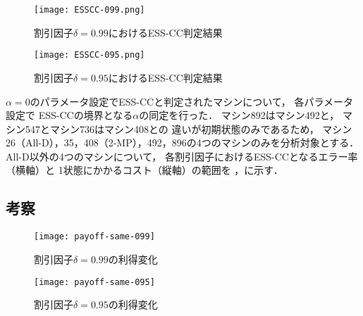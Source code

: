\documentclass[submit]{ipsj}
\theoremstyle{definition}
\begin{document}
\begin{figure*}[tb]
  \begin{minipage}{0.45\textwidth}
    \centering
    \texttt{[image: ESSCC-099.png]}
    \caption{割引因子$\delta = 0.99$におけるESS-CC判定結果}
    \label{fig:ESS-CC-099}
  \end{minipage}
  \hfill
  \begin{minipage}{0.45\textwidth}
    \centering
    \texttt{[image: ESSCC-095.png]}
    \caption{割引因子$\delta = 0.95$におけるESS-CC判定結果}
    \label{fig:ESS-CC-095}
  \end{minipage}
\end{figure*}

$\alpha = 0$のパラメータ設定でESS-CCと判定されたマシンについて，
各パラメータ設定で
ESS-CCの境界となる$\alpha$の同定を行った．
マシン892はマシン492と，
マシン547とマシン736はマシン408との
違いが初期状態のみであるため，
マシン26（All-D），35，408（2-MP），492，896の4つのマシンのみを分析対象とする．
All-D以外の4つのマシンについて，
各割引因子におけるESS-CCとなるエラー率（横軸）と
1状態にかかるコスト（縦軸）の範囲を
，に示す．

\subsection{考察} \label{sec:consideration}

\begin{figure*}[tb]
  \begin{minipage}{0.45\textwidth}
    \centering
    \texttt{[image: payoff-same-099]}
    \caption{割引因子$\delta = 0.99$の利得変化}
    \label{fig:payoff-same-099}
  \end{minipage}
  \hfill
  \begin{minipage}{0.45\textwidth}
    \centering
    \texttt{[image: payoff-same-095]}
    \caption{割引因子$\delta = 0.95$の利得変化}
    \label{fig:payoff-same-095}
  \end{minipage}
\end{figure*}
\end{document}
